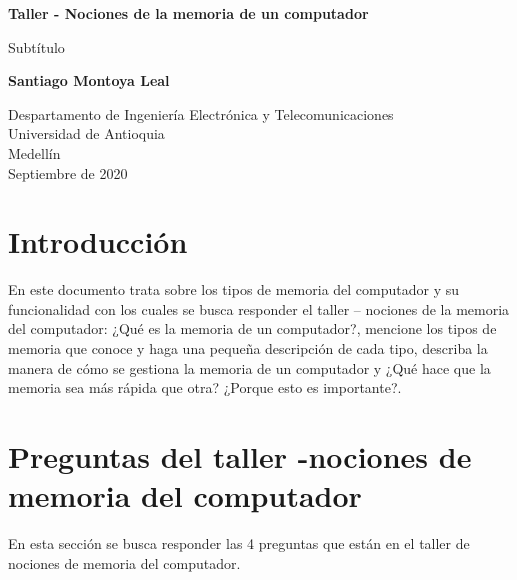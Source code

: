 \documentclass{article}
\begin{document}
\begin{titlepage}
    \begin{center}
        \vspace*{1cm}
            
        \Huge
        \textbf{Taller - Nociones de la memoria de un computador}
            
        \vspace{0.5cm}
        \LARGE
        Subtítulo
            
        \vspace{1.5cm}
            
        \textbf{Santiago Montoya Leal}
            
        \vfill
            
        \vspace{0.8cm}
            
        \Large
        Despartamento de Ingeniería Electrónica y Telecomunicaciones\\
        Universidad de Antioquia\\
        Medellín\\
        Septiembre de 2020
            
    \end{center}
\end{titlepage}

\tableofcontents
\newpage
\section{Introducción}\label{intro}
En este documento trata sobre los tipos de memoria del computador y su funcionalidad con los cuales se busca responder el taller – nociones de la memoria del computador: ¿Qué es la memoria de un computador?, mencione los tipos de memoria que conoce y haga una pequeña descripción de cada tipo, describa la manera de cómo se gestiona la memoria de un computador y ¿Qué hace que la memoria sea más rápida que otra? ¿Porque esto es importante?.

\section{Preguntas del taller -nociones de memoria del computador} \label{contenido}
En esta sección se busca responder las 4 preguntas que están en el taller de nociones de memoria del computador.
\end{document}
